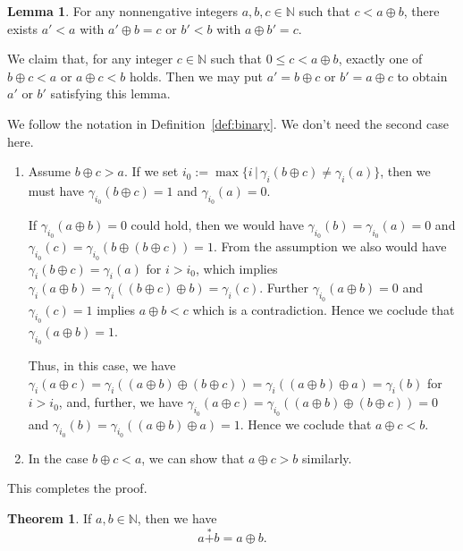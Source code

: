 \documentclass[a4paper,11pt]{amsart}
\theoremstyle{definition}
\newtheorem{thm}{Theorem}[section]
\newtheorem{lem}{Lemma}[section]
\newenvironment{demo}[1]{%
  \trivlist
  \item[\hskip\labelsep
        {\bf #1.}]
}{%
\hfill\qedsymbol
  \endtrivlist
}
\newcommand{\nimadd}{\overset{*}{+}}
\numberwithin{equation}{section}
\def\Non{\mathbb{N}}
\def\digit#1#2{\gamma_{#1}\left({#2}\right)}
\begin{document}
\begin{lem}
%
For any nonnengative integers $a,b,c\in\Non$ such that $c<a\oplus b$,
there exists $a'<a$ with $a'\oplus b=c$ or $b'<b$ with $a\oplus b'=c$.
%
\end{lem}
%
\begin{demo}{Proof}
%
We claim that, for any integer $c\in\Non$ such that $0\leq c<a\oplus b$,
exactly one of $b\oplus c< a$ or $a\oplus c < b$ holds.
Then we may put $a'=b\oplus c$ or $b'=a\oplus c$ to obtain $a'$ or $b'$ satisfying this lemma.
%
%
%
\par\smallskip
%
We follow the notation in Definition~\ref{def:binary}.
We don't need the second case here.
%
\begin{enumerate}[label=(\roman*)] %
%
\item
Assume $b\oplus c>a$.
If we set $i_{0}:=\max\{i\,|\,\digit{i}{b\oplus c}\neq\digit{i}{a}\}$,
then we must have $\digit{i_{0}}{b\oplus c}=1$ and $\digit{i_{0}}{a}=0$.
%
\par
%
If $\digit{i_{0}}{a\oplus b}=0$ could hold,
then we would have $\digit{i_{0}}{b}=\digit{i_{0}}{a}=0$ and $\digit{i_{0}}{c}=\digit{i_{0}}{b\oplus(b\oplus c)}=1$.
From the assumption we also would have $\digit{i}{b\oplus c}=\digit{i}{a}$ for $i>i_{0}$,
which implies $\digit{i}{a\oplus b}=\digit{i}{(b\oplus c)\oplus b}=\digit{i}{c}$.
Further $\digit{i_{0}}{a\oplus b}=0$ and $\digit{i_{0}}{c}=1$ implies $a\oplus b<c$ which is a contradiction.
Hence we coclude that $\digit{i_{0}}{a\oplus b}=1$.
%
\par
%
Thus, in this case, we have 
$\digit{i}{a\oplus c}=\digit{i}{(a\oplus b)\oplus(b\oplus c)}=\digit{i}{(a\oplus b)\oplus a}=\digit{i}{b}$
for $i>i_{0}$,
and, further, we have
$\digit{i_{0}}{a\oplus c}=\digit{i_{0}}{(a\oplus b)\oplus(b\oplus c)}=0$ and 
$\digit{i_{0}}{b}=\digit{i_{0}}{(a\oplus b)\oplus a}=1$.
Hence we coclude that $a\oplus c<b$.
%
\item
In the case 
$b\oplus c<a$, we can show that $a\oplus c>b$ similarly.
%
\end{enumerate} %
%
This completes the proof.
%
\end{demo}
%
%
%
\begin{thm}\label{thm:nimaddd=oplus}
%
If $a,b\in\Non$, then we have
\[
a\nimadd b = a \oplus b.
\]
%
\end{thm}
\end{document}
